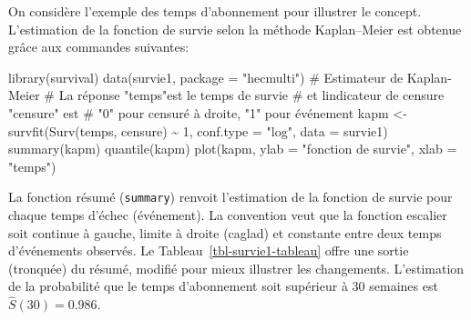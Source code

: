 \documentclass[
  11pt,
  letterpaper,
]{scrbook}
\newenvironment{Shaded}{\begin{snugshade}}{\end{snugshade}}
\newcommand{\AttributeTok}[1]{\textcolor[rgb]{0.40,0.45,0.13}{#1}}
\newcommand{\CommentTok}[1]{\textcolor[rgb]{0.37,0.37,0.37}{#1}}
\newcommand{\DecValTok}[1]{\textcolor[rgb]{0.68,0.00,0.00}{#1}}
\newcommand{\FunctionTok}[1]{\textcolor[rgb]{0.28,0.35,0.67}{#1}}
\newcommand{\NormalTok}[1]{\textcolor[rgb]{0.00,0.23,0.31}{#1}}
\newcommand{\OtherTok}[1]{\textcolor[rgb]{0.00,0.23,0.31}{#1}}
\newcommand{\SpecialCharTok}[1]{\textcolor[rgb]{0.37,0.37,0.37}{#1}}
\newcommand{\StringTok}[1]{\textcolor[rgb]{0.13,0.47,0.30}{#1}}
\theoremstyle{definition}
\theoremstyle{remark}
\begin{document}
On considère l'exemple des temps d'abonnement pour illustrer le concept.
L'estimation de la fonction de survie selon la méthode Kaplan--Meier est
obtenue grâce aux commandes suivantes:

\begin{Shaded}
\begin{Highlighting}[]
\FunctionTok{library}\NormalTok{(survival)}
\FunctionTok{data}\NormalTok{(survie1, }\AttributeTok{package =} \StringTok{"hecmulti"}\NormalTok{)}
\CommentTok{\# Estimateur de Kaplan{-}Meier}
\CommentTok{\# La réponse "temps"est le temps de survie }
\CommentTok{\# et l\textquotesingle{}indicateur de censure "censure" est}
\CommentTok{\# "0" pour censuré à droite, "1" pour événement}
\NormalTok{kapm }\OtherTok{\textless{}{-}} 
  \FunctionTok{survfit}\NormalTok{(}\FunctionTok{Surv}\NormalTok{(temps, censure) }\SpecialCharTok{\textasciitilde{}} \DecValTok{1}\NormalTok{, }
          \AttributeTok{conf.type =} \StringTok{"log"}\NormalTok{, }
          \AttributeTok{data =}\NormalTok{ survie1)}
\FunctionTok{summary}\NormalTok{(kapm)}
\FunctionTok{quantile}\NormalTok{(kapm)}
\FunctionTok{plot}\NormalTok{(kapm, }
     \AttributeTok{ylab =} \StringTok{"fonction de survie"}\NormalTok{, }
     \AttributeTok{xlab =} \StringTok{"temps"}\NormalTok{) }
\end{Highlighting}
\end{Shaded}

La fonction résumé (\texttt{summary}) renvoit l'estimation de la
fonction de survie pour chaque temps d'échec (événement). La convention
veut que la fonction escalier soit continue à gauche, limite à droite
(caglad) et constante entre deux temps d'événements observés. Le
Tableau~\ref{tbl-survie1-tableau} offre une sortie (tronquée) du résumé,
modifié pour mieux illustrer les changements. L'estimation de la
probabilité que le temps d'abonnement soit supérieur à 30 semaines est
\(\widehat{S}(30)=0.986\).
\end{document}
